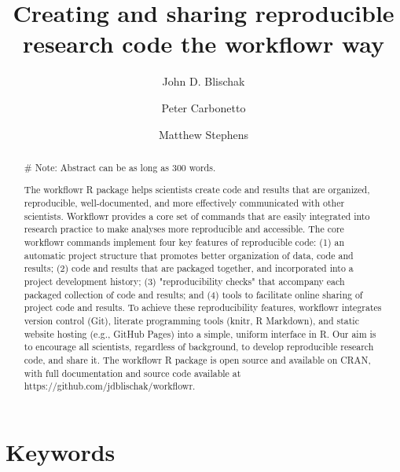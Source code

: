 \documentclass[9pt,a4paper]{extarticle}
\begin{document}
\pagestyle{front}

\title{Creating and sharing reproducible research code the workflowr
way}

\author[1]{John D. Blischak}

\author[1,2]{Peter Carbonetto}

\author[1,3]{Matthew Stephens}




\maketitle

\thispagestyle{front}

\begin{abstract}

\# Note: Abstract can be as long as 300 words.

The workflowr R package helps scientists create code and results that
are organized, reproducible, well-documented, and more effectively
communicated with other scientists. Workflowr provides a core set of
commands that are easily integrated into research practice to make
analyses more reproducible and accessible. The core workflowr commands
implement four key features of reproducible code: (1) an automatic
project structure that promotes better organization of data, code and
results; (2) code and results that are packaged together, and
incorporated into a project development history; (3) "reproducibility
checks" that accompany each packaged collection of code and results; and
(4) tools to facilitate online sharing of project code and results. To
achieve these reproducibility features, workflowr integrates version
control (Git), literate programming tools (knitr, R Markdown), and
static website hosting (e.g., GitHub Pages) into a simple, uniform
interface in R. Our aim is to encourage all scientists, regardless of
background, to develop reproducible research code, and share it. The
workflowr R package is open source and available on CRAN, with full
documentation and source code available at
https://github.com/jdblischak/workflowr.

\end{abstract}

\section*{Keywords}
\end{document}
